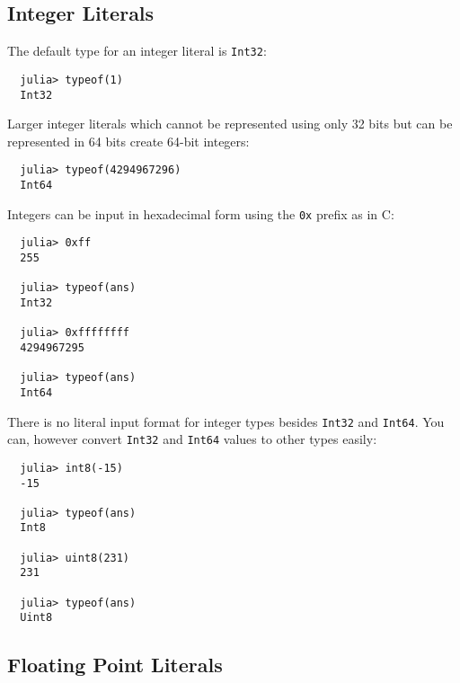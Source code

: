 \documentclass{article}
\renewcommand{\sec}[1]{\label{sec:#1}}
\begin{document}
\subsection{Integer Literals}\sec{integer-literals}

The default type for an integer literal is \verb|Int32|:
\begin{verbatim}
  julia> typeof(1)
  Int32
\end{verbatim}
Larger integer literals which cannot be represented using only 32 bits but can be represented in 64 bits create 64-bit integers:
\begin{verbatim}
  julia> typeof(4294967296)
  Int64
\end{verbatim}
Integers can be input in hexadecimal form using the \verb|0x| prefix as in C:
\begin{verbatim}
  julia> 0xff
  255

  julia> typeof(ans)
  Int32

  julia> 0xffffffff
  4294967295

  julia> typeof(ans)
  Int64
\end{verbatim}
There is no literal input format for integer types besides \verb|Int32| and \verb|Int64|. You can, however convert \verb|Int32| and \verb|Int64| values to other types easily:
\begin{verbatim}
  julia> int8(-15)
  -15

  julia> typeof(ans)
  Int8

  julia> uint8(231)
  231

  julia> typeof(ans)
  Uint8
\end{verbatim}

\subsection{Floating Point Literals}\sec{floating-point-literals}
\end{document}
